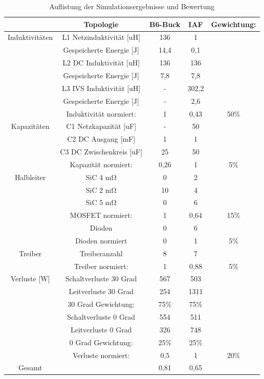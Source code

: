 \begin{table}
\begin{tabular}{|c|c|c|c|c|}
	\hline
	& Topologie & B6-Buck & \gls{IAF} & Gewichtung: \\
	\hline
	Induktivitäten& L1 Netzinduktivität [uH]& 136 & 1 &  \\
	\hline
	 & Gespeicherte Energie [J]& 14,4 & 0,1 & \\
	\hline
	& L2 DC Induktivität [uH]& 136 & 136 &  \\
	\hline
	& Gespeicherte Energie [J]& 7,8 & 7,8 &  \\
	\hline
	& L3 IVS Induktivität [uH]& - & 302,2 &  \\
	\hline
	& Gespeicherte Energie [J] & - & 2,6 & \\
	\hline
	& Induktivität normiert: &\cellcolor{red!25}  1 & \cellcolor{green!25} 0,43 & 50\% \\
	\hline
	Kapazitäten & C1 Netzkapazität [uF]& - & 50 &  \\
	\hline
	& C2 DC Ausgang [mF]& 1 & 1 &  \\
	\hline
	& C3 DC Zwischenkreis [uF]& 25 & 50 &  \\
	\hline
	& Kapazität normiert: & \cellcolor{green!25} 0,26 & \cellcolor{red!25} 1 & 5\% \\
	\hline
	Halbleiter & SiC 4 \si{\milli \ohm} & 0 & 2 &  \\
	\hline
	& SiC 2 \si{\milli \ohm} & 10 & 4 &  \\
	\hline
	& SiC 5 \si{\milli \ohm} & 0 & 6 &  \\
	\hline
	& MOSFET normiert: & \cellcolor{red!25} 1 & \cellcolor{yellow!25} 0,64 & 15\% \\
	\hline
	& Dioden & 0 & 6 &  \\
	\hline
	& Dioden normiert &\cellcolor{green!25} 0 & \cellcolor{red!25} 1 & 5\% \\
	\hline
	Treiber & Treiberanzahl & 8 & 7 &  \\
	\hline
	& Treiber normiert: & \cellcolor{red!25}1 & \cellcolor{yellow!25} 0,88 & 5\% \\
	\hline
	Verluste [W] & Schaltverluste 30 Grad & 567 & 503 &  \\
	\hline
	& Leitverluste 30 Grad & 254 & 1311 &  \\
	\hline
	& 30 Grad Gewichtung: & 75\% & 75\% &  \\
	\hline
	& Schaltverluste 0 Grad & 554 & 511 &  \\
	\hline
	& Leitverluste 0 Grad & 326 & 748 &  \\
	\hline
	& 0 Grad Gewichtung: & 25\% & 25\% &  \\
	\hline
	& Verluste normiert: &\cellcolor{yellow!25} 0,5 & \cellcolor{red!25} 1 & 20\% \\
	\hline
	Gesamt &  & \cellcolor{red!25} 0,81 & \cellcolor{yellow!25} 0,65 & \\
	\hline
\end{tabular}
\caption{Auflistung der Simulationsergebnisse und Bewertung}
\label{tab:Auswertung}
\end{table}


